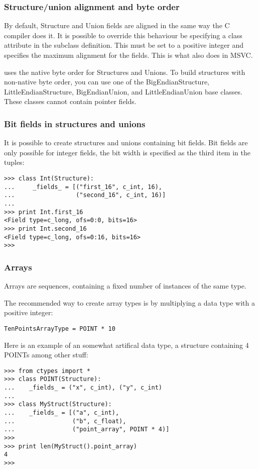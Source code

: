 \subsubsection{Structure/union alignment and byte order\label{ctypes-structureunion-alignment-byte-order}}

By default, Structure and Union fields are aligned in the same way the
C compiler does it. It is possible to override this behaviour be
specifying a  class attribute in the subclass
definition. This must be set to a positive integer and specifies the
maximum alignment for the fields. This is what 
also does in MSVC.

 uses the native byte order for Structures and Unions.  To
build structures with non-native byte order, you can use one of the
BigEndianStructure, LittleEndianStructure, BigEndianUnion, and
LittleEndianUnion base classes.  These classes cannot contain pointer
fields.


\subsubsection{Bit fields in structures and unions\label{ctypes-bit-fields-in-structures-unions}}

It is possible to create structures and unions containing bit fields.
Bit fields are only possible for integer fields, the bit width is
specified as the third item in the  tuples:
\begin{verbatim}
>>> class Int(Structure):
...     _fields_ = [("first_16", c_int, 16),
...                 ("second_16", c_int, 16)]
...
>>> print Int.first_16
<Field type=c_long, ofs=0:0, bits=16>
>>> print Int.second_16
<Field type=c_long, ofs=0:16, bits=16>
>>>
\end{verbatim}


\subsubsection{Arrays\label{ctypes-arrays}}

Arrays are sequences, containing a fixed number of instances of the
same type.

The recommended way to create array types is by multiplying a data
type with a positive integer:
\begin{verbatim}
TenPointsArrayType = POINT * 10
\end{verbatim}

Here is an example of an somewhat artifical data type, a structure
containing 4 POINTs among other stuff:
\begin{verbatim}
>>> from ctypes import *
>>> class POINT(Structure):
...    _fields_ = ("x", c_int), ("y", c_int)
...
>>> class MyStruct(Structure):
...    _fields_ = [("a", c_int),
...                ("b", c_float),
...                ("point_array", POINT * 4)]
>>>
>>> print len(MyStruct().point_array)
4
>>>
\end{verbatim}

